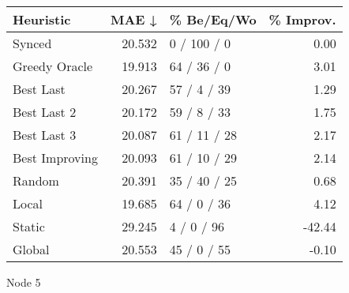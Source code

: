 \begin{tabular}{lrlr}
\toprule
\textbf{Heuristic} & \textbf{MAE ↓} & \textbf{\% Be/Eq/Wo} & \textbf{\% Improv.} \\
\midrule
            Synced &         20.532 &          0 / 100 / 0 &                0.00 \\
     Greedy Oracle &         19.913 &          64 / 36 / 0 &                3.01 \\
         Best Last &         20.267 &          57 / 4 / 39 &                1.29 \\
       Best Last 2 &         20.172 &          59 / 8 / 33 &                1.75 \\
       Best Last 3 &         20.087 &         61 / 11 / 28 &                2.17 \\
    Best Improving &         20.093 &         61 / 10 / 29 &                2.14 \\
            Random &         20.391 &         35 / 40 / 25 &                0.68 \\
             Local &         19.685 &          64 / 0 / 36 &                4.12 \\
            Static &         29.245 &           4 / 0 / 96 &              -42.44 \\
            Global &         20.553 &          45 / 0 / 55 &               -0.10 \\
\bottomrule
\end{tabular}
\caption{Node 5}
\label{tab:non_lr01_le2_bs2_5}
